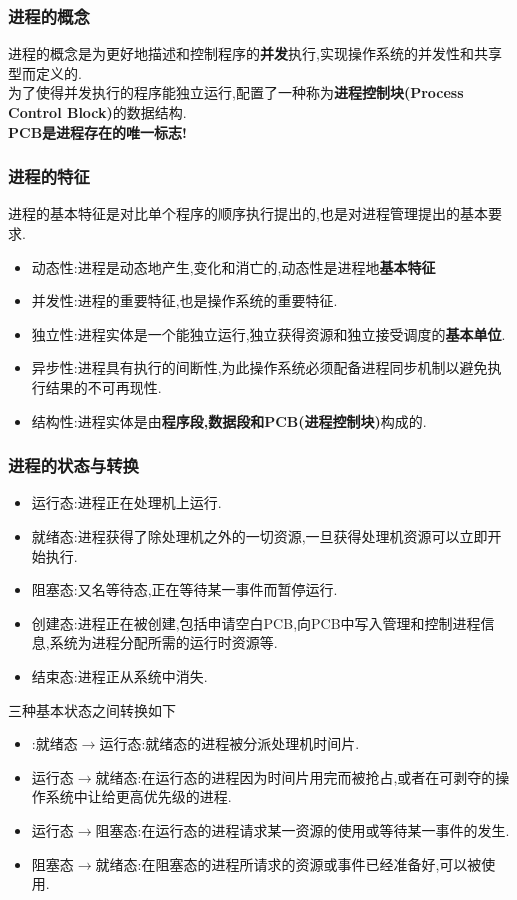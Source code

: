 \documentclass{ctexart}
\begin{document}
\subsubsection{进程的概念}
进程的概念是为更好地描述和控制程序的\textbf{并发}执行,实现操作系统的并发性和共享型而定义的.\\
为了使得并发执行的程序能独立运行,配置了一种称为\textbf{进程控制块(Process Control Block)}的数据结构.\\
\textbf{PCB是进程存在的唯一标志!}

\subsubsection{进程的特征}
进程的基本特征是对比单个程序的顺序执行提出的,也是对进程管理提出的基本要求.
\begin{itemize}
	\item 动态性:进程是动态地产生,变化和消亡的,动态性是进程地\textbf{基本特征}
	\item 并发性:进程的重要特征,也是操作系统的重要特征.
	\item 独立性:进程实体是一个能独立运行,独立获得资源和独立接受调度的\textbf{基本单位}.
	\item 异步性:进程具有执行的间断性,为此操作系统必须配备进程同步机制以避免执行结果的不可再现性.
	\item 结构性:进程实体是由\textbf{程序段,数据段和PCB(进程控制块)}构成的.
\end{itemize}
\subsubsection{进程的状态与转换}
\begin{itemize}
	\item 运行态:进程正在处理机上运行.
	\item 就绪态:进程获得了除处理机之外的一切资源,一旦获得处理机资源可以立即开始执行.
	\item 阻塞态:又名等待态,正在等待某一事件而暂停运行.
	\item 创建态:进程正在被创建,包括申请空白PCB,向PCB中写入管理和控制进程信息,系统为进程分配所需的运行时资源等.
	\item 结束态:进程正从系统中消失.
\end{itemize}
三种基本状态之间转换如下
\begin{itemize}
	\item:就绪态$\rightarrow$运行态:就绪态的进程被分派处理机时间片.
	\item 运行态$\rightarrow$就绪态:在运行态的进程因为时间片用完而被抢占,或者在可剥夺的操作系统中让给更高优先级的进程.
	\item 运行态$\rightarrow$阻塞态:在运行态的进程请求某一资源的使用或等待某一事件的发生.
	\item 阻塞态$\rightarrow$就绪态:在阻塞态的进程所请求的资源或事件已经准备好,可以被使用.
\end{itemize}
\end{document}
